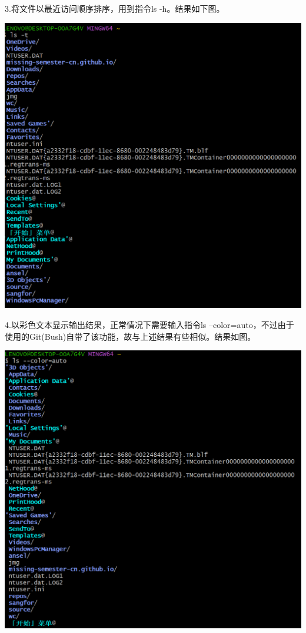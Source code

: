 \documentclass[UTF8,a4paper]{ctexart}
\begin{document}
\begin{sloppypar}
	3.将文件以最近访问顺序排序，用到指令ls -h。结果如下图。
	
	\includegraphics[width = 16cm]{4}

	4.以彩色文本显示输出结果，正常情况下需要输入指令ls --color=auto，不过由于使用的Git(Bush)自带了该功能，故与上述结果有些相似。结果如图。
	
	\includegraphics[width = 16cm]{5}
	

\end{sloppypar}
\end{document}
